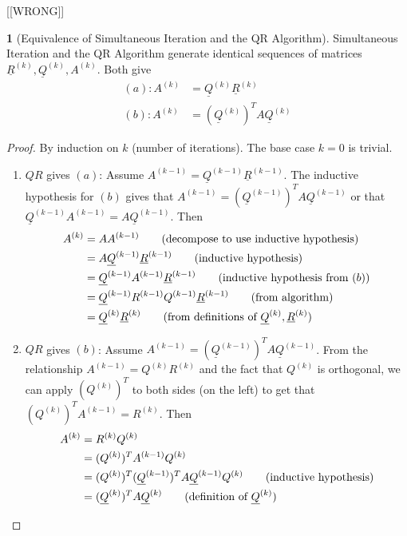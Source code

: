 \documentclass[12pt]{article}
\theoremstyle{definition}
\newtheorem{theorem}{\color{ForestGreen}{\textbf{Theorem}}}
\theoremstyle{definition}
\begin{document}
[[WRONG]]
\begin{theorem}[Equivalence of Simultaneous Iteration and the QR Algorithm]
Simultaneous Iteration and the QR Algorithm generate identical sequences of matrices $\underline R^{(k)}, \underline Q^{(k)}, A^{(k)}$. Both give
\begin{align}
	(a): A^{(k)} &= \underline Q^{(k)} \underline R^{(k)} \tag{$QR$ factorization of the $k$th power of $A$}\\
	(b): A^{(k)} &= (\underline Q^{(k)})^T A \underline Q^{(k)} \tag{projection}
\end{align}
\end{theorem}
\begin{proof}
By induction on $k$ (number of iterations). The base case $k=0$ is trivial. 
\begin{enumerate}
	\item $QR$ gives $(a)$: Assume $A^{(k-1)} = \underline Q^{(k-1)} \underline R^{(k-1)}$. The inductive hypothesis for $(b)$ gives that $A^{(k-1)} = (\underline Q^{(k-1)})^T A \underline Q^{(k-1)}$ or that $ \underline Q^{(k-1)} A^{(k-1)} = A \underline Q^{(k-1)}$. Then
	\begin{align*}
		A^{(k)} &= A A^{(k-1)} \tag{decompose to use inductive hypothesis}\\
		&= A \underline Q^{(k-1)} \underline R^{(k-1)} \tag{inductive hypothesis}\\
		&= \underline Q^{(k-1)} A^{(k-1)} \underline R^{(k-1)} \tag{inductive hypothesis from $(b)$}\\
		&= \underline Q^{(k-1)} R^{(k-1)}Q^{(k-1)} \underline R^{(k-1)} \tag{from algorithm} \\
		&= \underline Q^{(k)} \underline R^{(k)} \tag{from definitions of $\underline Q^{(k)}, \underline R^{(k)}$}
	\end{align*}
	\item $QR$ gives $(b)$: Assume $A^{(k-1)} = (\underline Q^{(k-1)})^T A \underline Q^{(k-1)}$. From the relationship $A^{(k-1)} = Q^{(k)}R^{(k)}$ and the fact that $Q^{(k)}$ is orthogonal, we can apply $(Q^{(k)})^T$ to both sides (on the left) to get that $(Q^{(k)})^T A^{(k-1)} = R^{(k)}$. Then
	\begin{align*}
		A^{(k)} &= R^{(k)}Q^{(k)} \\
		&= (Q^{(k)})^T A^{(k-1)} Q^{(k)} \\
		&= (Q^{(k)})^T (\underline Q^{(k-1)})^T A \underline Q^{(k-1)} Q^{(k)} \tag{inductive hypothesis} \\
		&= (\underline Q^{(k)})^T A \underline Q^{(k)} \tag{definition of $\underline Q^{(k)}$}
	\end{align*}
\end{enumerate}
\end{proof}
\end{document}
